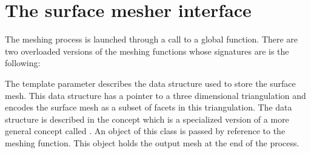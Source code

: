 \section{The surface mesher interface}
\label{SurfaceMesher_section_interface}

The meshing process is launched through a call to a global function.
There are two overloaded versions of the meshing functions
whose signatures are  is the following:






The template parameter  describes 
the data structure
used to store  the surface mesh. This data structure
has a pointer to a three dimensional triangulation and encodes
the surface mesh as a subset of facets in this triangulation.
The data structure is described in the concept
 which is a specialized version
of a more general concept called  .
An object of this class is passed by reference to the meshing
function. This object holds the output mesh at the end of the
process.

